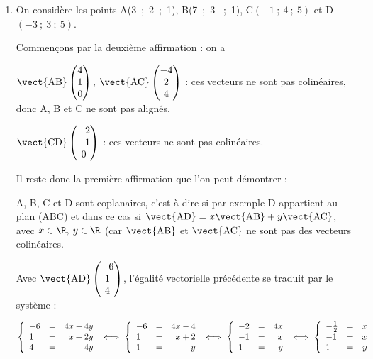 \begin{enumerate}
\begin{enumerate}

	\end{enumerate}
\item On considère les points A(3~;~2~;~1), B(7~;~3 ~;~1), C$(-1~;~4~;~5)$ et D$(- 3~;~3~;~5)$.

Commençons par la deuxième affirmation : on a 

$\vect{\text{AB}}\begin{pmatrix}4\\1\\0\end{pmatrix}, \: \vect{\text{AC}}\begin{pmatrix}-4\\2\\4\end{pmatrix}$ : ces vecteurs ne sont pas colinéaires, donc A, B et C ne sont pas alignés.

$\vect{\text{CD}}\begin{pmatrix}-2\\-1\\0\end{pmatrix}$ : ces vecteurs ne sont pas colinéaires.

Il reste donc la première affirmation que l'on peut démontrer :

A, B, C et D sont coplanaires, c'est-à-dire si par exemple D appartient au plan (ABC) et dans ce cas si $\vect{\text{AD}} = x\vect{\text{AB}} + y\vect{\text{AC}}$, avec $x \in \R,\: y \in \R$ (car $\vect{\text{AB}}$ et $\vect{\text{AC}}$ ne sont pas des vecteurs colinéaires.

Avec $\vect{\text{AD}}\begin{pmatrix}-6\\1\\4\end{pmatrix}$, l'égalité vectorielle précédente se traduit par le système :

$\left\{\begin{array}{l c r}
-6&=&4x - 4y\\
1&=&x + 2y\\
4 &=& 4y
\end{array}\right. \iff \left\{\begin{array}{l c r}
-6&=&4x - 4\\
1&=&x + 2\\
1 &=& y
\end{array}\right. \iff
\left\{\begin{array}{l c r}
-2&=&4x\\
-1&=&x\\
1 &=& y
\end{array}\right. \iff \left\{\begin{array}{l c r}
-\frac12&=&x\\
-1&=&x\\
1 &=& y
\end{array}\right.$


\end{enumerate}
